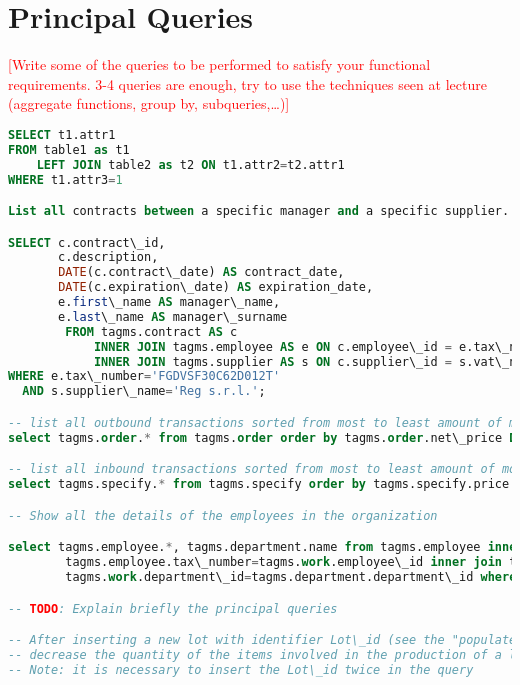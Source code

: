 \section{Principal Queries}
\textcolor{red}{[Write some of the queries to be performed to satisfy your functional requirements. 3-4 queries are enough, try to use the techniques seen at lecture (aggregate functions, group by, subqueries,…)]}

\begin{lstlisting}[language=SQL,
keywordstyle=\color{blue},
stringstyle=\color{mauve},
showstringspaces=false,
basicstyle=\ttfamily\footnotesize]
SELECT t1.attr1
FROM table1 as t1
    LEFT JOIN table2 as t2 ON t1.attr2=t2.attr1 
WHERE t1.attr3=1

List all contracts between a specific manager and a specific supplier.

SELECT c.contract\_id,
       c.description,
       DATE(c.contract\_date) AS contract_date,
       DATE(c.expiration\_date) AS expiration_date,
       e.first\_name AS manager\_name,
       e.last\_name AS manager\_surname
		FROM tagms.contract AS c
		    INNER JOIN tagms.employee AS e ON c.employee\_id = e.tax\_number
		    INNER JOIN tagms.supplier AS s ON c.supplier\_id = s.vat\_number
WHERE e.tax\_number='FGDVSF30C62D012T'
  AND s.supplier\_name='Reg s.r.l.';

-- list all outbound transactions sorted from most to least amount of money:
select tagms.order.* from tagms.order order by tagms.order.net\_price DESC;

-- list all inbound transactions sorted from most to least amount of money:
select tagms.specify.* from tagms.specify order by tagms.specify.price DESC;

-- Show all the details of the employees in the organization

select tagms.employee.*, tagms.department.name from tagms.employee inner join tagms.work on
        tagms.employee.tax\_number=tagms.work.employee\_id inner join tagms.department on
        tagms.work.department\_id=tagms.department.department\_id where tagms.employee.still\_working=TRUE;

-- TODO: Explain briefly the principal queries

-- After inserting a new lot with identifier Lot\_id (see the "populate" section)
-- decrease the quantity of the items involved in the production of a lot
-- Note: it is necessary to insert the Lot\_id twice in the query


\end{lstlisting}

